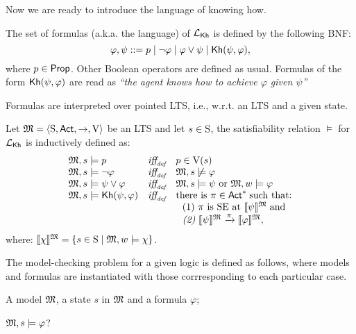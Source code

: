 Now we are ready to introduce the language of knowing how.

\begin{definition}
    \label{def:syntax}
    The set of formulas (a.k.a. the language) of $\Khlogic$ is defined by the following BNF:
    \[
        \varphi, \psi ::= p \mid \neg \varphi \mid \varphi \vee \psi \mid \kh(\psi,\varphi),
    \]
    where $p\in\Prop$. Other Boolean operators are defined as usual. Formulas of the form $\kh(\psi,\varphi)$ are read as \emph{``the agent knows how to achieve $\varphi$ given $\psi$''}
\end{definition}

Formulas are interpreted over pointed LTS, i.e., w.r.t. an LTS and a given state. 

\begin{definition} \label{def:semantics-kh}
    Let $\model = \tup{\S,\Act,\ra,\V}$ be an LTS and let $s\in\S$, the satisfiability relation $\models$ for $\Khlogic$ is inductively defined as:
    \[
    \begin{array}{l@{\ \ \ }c@{\ \ \  }l}
    \model, s \models p & \iffdef & p \in \V(s) \\
    \model, s\models \neg\varphi & \iffdef & \model, s \not\models \varphi \\
    \model, s \models \psi\vee\varphi & \iffdef & \model, s \models \psi \mbox{ or }\model, w \models \varphi \\
    \model, s \models \kh(\psi,\varphi) & \iffdef & \text{there is } \plan \in \Act^* \;\text{such that:} \\
    & & \ \ \text{\rm (1)} \ \plan \text{ is SE at }  \truthset{\model}{\psi}\; \text{and} \\
    & & \ \ \text{\em (2)} \ \truthset{\model}{\psi} \reach{\plan} \truthset{\model}{\varphi}, 
    \end{array}
    \]      where: $\truthset{\model}{\chi} = \csetsc{s\in\S}{\model,w\models\chi}$. 
\end{definition}

The model-checking problem for a given logic is defined as follows, where models and formulas are instantiated with those corrresponding to each particular case. 

\begin{description} \itemsep 0cm
    \item[Input:] A model $\model$, a state $s$ in $\model$ and a formula $\varphi$;
    \item[Output:] $\model,s\models\varphi$?
\end{description}

